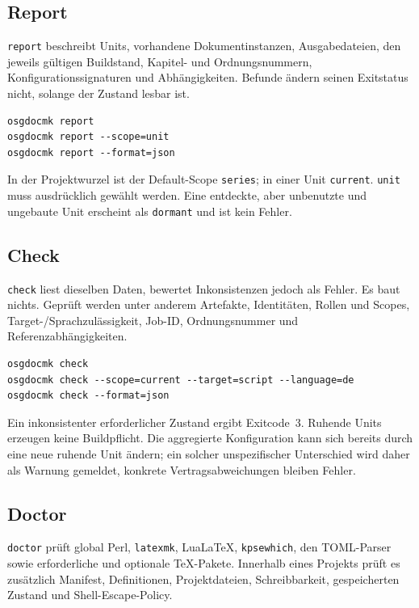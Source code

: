\documentclass[
load-preamble+
]{osgdoc}
\begin{document}
\subsection{Report}

\texttt{report} beschreibt Units, vorhandene Dokumentinstanzen,
Ausgabedateien, den jeweils gültigen Buildstand, Kapitel- und Ordnungsnummern, Konfigurationssignaturen und
Abhängigkeiten. Befunde ändern seinen Exitstatus nicht, solange der Zustand
lesbar ist.

\begin{verbatim}
osgdocmk report
osgdocmk report --scope=unit
osgdocmk report --format=json
\end{verbatim}

In der Projektwurzel ist der Default-Scope \texttt{series}; in einer Unit
\texttt{current}. \texttt{unit} muss ausdrücklich gewählt werden. Eine
entdeckte, aber unbenutzte und ungebaute Unit erscheint als \texttt{dormant}
und ist kein Fehler.

\subsection{Check}

\texttt{check} liest dieselben Daten, bewertet Inkonsistenzen jedoch als
Fehler. Es baut nichts. Geprüft werden unter anderem Artefakte, Identitäten,
Rollen und Scopes, Target-/Sprachzulässigkeit, Job-ID, Ordnungsnummer und
Referenzabhängigkeiten.

\begin{verbatim}
osgdocmk check
osgdocmk check --scope=current --target=script --language=de
osgdocmk check --format=json
\end{verbatim}

Ein inkonsistenter erforderlicher Zustand ergibt Exitcode~3. Ruhende Units
erzeugen keine Buildpflicht. Die aggregierte Konfiguration kann sich bereits
durch eine neue ruhende Unit ändern; ein solcher unspezifischer Unterschied
wird daher als Warnung gemeldet, konkrete Vertragsabweichungen bleiben Fehler.

\subsection{Doctor}

\texttt{doctor} prüft global Perl, \texttt{latexmk}, LuaLaTeX,
\texttt{kpsewhich}, den TOML-Parser sowie erforderliche und optionale
TeX-Pakete. Innerhalb eines Projekts prüft es zusätzlich Manifest,
Definitionen, Projektdateien, Schreibbarkeit, gespeicherten Zustand und
Shell-Escape-Policy.
\end{document}
